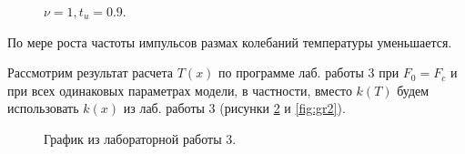 \documentclass[a4paper,14pt]{article}
\begin{document}
\newpage
\begin{figure}[!h]
	\caption{$\nu = 1, t_u = 0.9$.}
	\label{fig:nu1}
\end{figure}

По мере роста частоты импульсов размах колебаний
температуры уменьшается.

Рассмотрим результат расчета $T(x)$ по программе лаб. работы 3 при $F_0=F_c$
и при всех одинаковых параметрах модели, 
в частности, вместо $k(T)$ будем использовать $k(x)$ из лаб. работы 3 
(рисунки \ref{fig:gr1} и \ref{fig:gr2}).

\newpage
\begin{figure}[!h]
	\caption{График из лабораторной работы 3.}
	\label{fig:gr1}
\end{figure}
\end{document}
